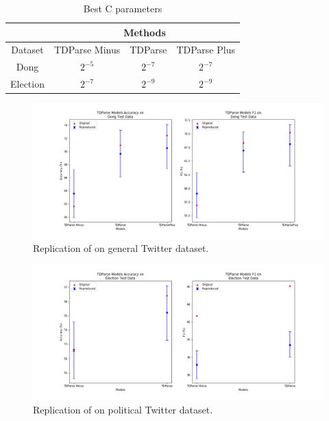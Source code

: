 \begin{table}[]
    \centering
    \begin{tabular}{|c|c|c|c|}
        \hline
         & \multicolumn{3}{|c|}{Methods} \\
        \hline
        Dataset & TDParse Minus & TDParse & TDParse Plus \\
        \hline
        Dong & $2^{-5}$ & $2^{-7}$ & $2^{-7}$ \\
        \hline
        Election & $2^{-7}$ & $2^{-9}$ & $2^{-9}$ \\
        \hline
    \end{tabular}
    \caption{Best C parameters}
    \label{table:repro_rep_wang_c}
\end{table}

\begin{figure}
    \centering
    \includegraphics[scale=0.55]{images/reproducibility/Replication_Cases/TDParse_Replication_Dong.png}
    \caption{Replication of \citet{wang-etal-2017-tdparse} on \citet{dong-etal-2014-adaptive} general Twitter dataset.}
    \label{fig:repro_wang_dong_method}
\end{figure}

\begin{figure}
    \centering
    \includegraphics[scale=0.55]{images/reproducibility/Replication_Cases/TDParse_Replication_Election.png}
    \caption{Replication of \citet{wang-etal-2017-tdparse} on \citet{wang-etal-2017-tdparse} political Twitter dataset.}
    \label{fig:repro_wang_elec_method}
\end{figure}

